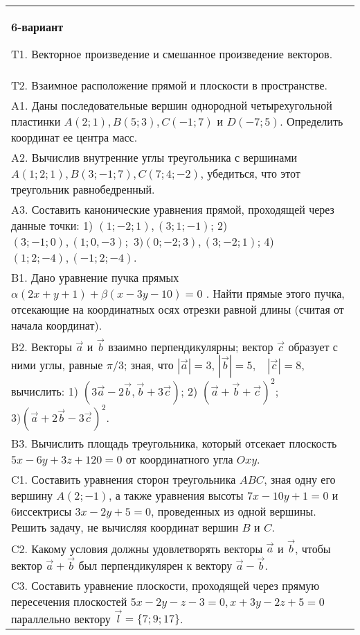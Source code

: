 \documentclass{article}
\begin{document}
\begin{tabular}{m{17cm}}
\textbf{6-вариант}
\newline

T1. 
Векторное произведение и смешанное произведение векторов.
 \\
T2. 
Взаимное расположение прямой и плоскости в пространстве.
 \\
A1. 
Даны последовательные вершин однородной четырехугольной пластинки \(A(2;1),B(5;3),C( - 1;7)\) и \(D( - 7;5)\). Определить координат ее центра масс.
 \\
A2. 
Вычислив внутренние углы треугольника с вершинами \(A(1;2;1),B(3; - 1;7),C(7;4; - 2)\), убедиться, что этот треугольник равнобедренный.
 \\
A3. 
Составить канонические уравнения прямой, проходящей через данные точки: 1) \((1; - 2;1),(3;1; - 1)\); 2) \((3; - 1;0),(1;0, - 3);\) \(3)(0; - 2;3),(3; - 2;1)\); 4) \((1;2; - 4),( - 1;2; - 4)\).
 \\
B1. 
Дано уравнение пучка прямых \(\alpha(2x + y + 1) + \beta(x - 3y - 10) = 0\) . Найти прямые этого пучка, отсекающие на координатных осях отрезки равной длины (считая от начала координат).
 \\
B2. 
Векторы \(\overrightarrow{a}\) и \(\overrightarrow{b}\) взаимно перпендикулярны; вектор \(\overrightarrow{c}\) образует с ними углы, равные \(\pi/3\); зная, что \(|\overrightarrow{a}| = 3\), \(|\overrightarrow{b}| = 5,\ \ \ \ |\overrightarrow{c}| = 8\), вычислить: 1) \(\left( 3\overrightarrow{a} - 2\overrightarrow{b},\overrightarrow{b} + 3\overrightarrow{c} \right)\); 2) \((\overrightarrow{a} + \overrightarrow{b} + \overrightarrow{c})^{2};\) \(3)(\overrightarrow{a} + 2\overrightarrow{b} - 3\overrightarrow{c})^{2}\).
 \\
B3. 
Вычислить площадь треугольника, который отсекает плоскость \(5x - 6y + 3z + 120 = 0\) от координатного угла \(Oxy\).
 \\
C1. 
Составить уравнения сторон треугольника \(ABC\), зная одну его вершину \(A(2; - 1)\), а также уравнения высоты \(7x - 10y + 1 = 0\) и 6иссектрисы \(3x - 2y + 5 = 0\), проведенных из одной вершины. Решить задачу, не вычисляя координат вершин \(B\) и \(C\).
 \\
C2. 
Какому условия должны удовлетворять векторы \(\overrightarrow{a}\) и \(\overrightarrow{b}\), чтобы вектор \(\overrightarrow{a} + \overrightarrow{b}\) был перпендикулярен к вектору \(\overrightarrow{a} - \overrightarrow{b}\).
 \\
C3. 
Составить уравнение плоскости, проходящей через прямую пересечения плоскостей \(5x - 2y - z - 3 = 0,x + 3y - 2z + 5 = 0\) параллельно вектору \(\overrightarrow{l} = \{ 7;9;17\}\).
 \\

\end{tabular}
\vspace{1cm}
\end{document}

